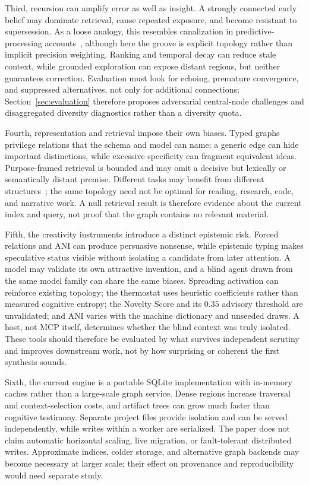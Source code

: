 Third, recursion can amplify error as well as insight. A strongly connected early belief may dominate retrieval, cause repeated exposure, and become resistant to supersession. As a loose analogy, this resembles canalization in predictive-processing accounts~\cite{carhartharris2023canalization}, although here the groove is explicit topology rather than implicit precision weighting. Ranking and temporal decay can reduce stale context, while grounded exploration can expose distant regions, but neither guarantees correction. Evaluation must look for echoing, premature convergence, and suppressed alternatives, not only for additional connections; Section~\ref{sec:evaluation} therefore proposes adversarial central-node challenges and disaggregated diversity diagnostics rather than a diversity quota.

Fourth, representation and retrieval impose their own biases. Typed graphs privilege relations that the schema and model can name; a generic edge can hide important distinctions, while excessive specificity can fragment equivalent ideas. Purpose-framed retrieval is bounded and may omit a decisive but lexically or semantically distant premise. Different tasks may benefit from different structures~\cite{li2024structrag}; the same topology need not be optimal for reading, research, code, and narrative work. A null retrieval result is therefore evidence about the current index and query, not proof that the graph contains no relevant material.

Fifth, the creativity instruments introduce a distinct epistemic risk. Forced relations and ANI can produce persuasive nonsense, while epistemic typing makes speculative status visible without isolating a candidate from later attention. A model may validate its own attractive invention, and a blind agent drawn from the same model family can share the same biases. Spreading activation can reinforce existing topology; the thermostat uses heuristic coefficients rather than measured cognitive entropy; the Novelty Score and its $0.35$ advisory threshold are unvalidated; and ANI varies with the machine dictionary and unseeded draws. A host, not MCP itself, determines whether the blind context was truly isolated. These tools should therefore be evaluated by what survives independent scrutiny and improves downstream work, not by how surprising or coherent the first synthesis sounds.

Sixth, the current engine is a portable SQLite implementation with in-memory caches rather than a large-scale graph service. Dense regions increase traversal and context-selection costs, and artifact trees can grow much faster than cognitive testimony. Separate project files provide isolation and can be served independently, while writes within a worker are serialized. The paper does not claim automatic horizontal scaling, live migration, or fault-tolerant distributed writes. Approximate indices, colder storage, and alternative graph backends may become necessary at larger scale; their effect on provenance and reproducibility would need separate study.

